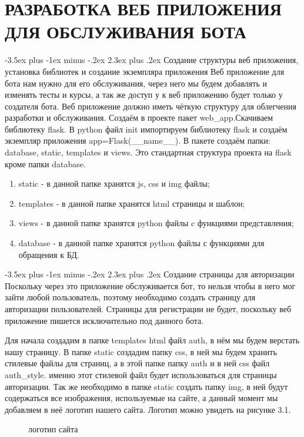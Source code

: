 \documentclass[12pt, oldlfont, amsfonts]{report}
\makeatletter
\renewcommand{\section}{\@startsection{section}{1}{0pt}%
                                {-3.5ex plus -1ex minus -.2ex}%
                                {2.3ex plus .2ex}%
{\centering\hyphenpenalty=10000\normalfont\Large\bfseries}}
\makeatother
\begin{document}
\chapter{\large{{РАЗРАБОТКА ВЕБ ПРИЛОЖЕНИЯ ДЛЯ ОБСЛУЖИВАНИЯ БОТА}}}
\section{Создание структуры веб приложения, установка библиотек и создание экземпляра приложения}
Веб приложение для бота нам нужно для его обслуживания, через него мы будем добавлять и изменять тесты и курсы, а так же доступ у к веб приложению будет только у создателя бота. Веб приложение должно иметь чёткую структуру для облегчения разработки и обслуживания. Создаём в проекте пакет { web\_app}.Скачиваем библиотеку flask. В python файл { init} импортируем библиотеку flask и создаём экземпляр приложения { app=Flask(\_\_name\_\_)}. В пакете создаём папки: { database}, { static}, { templates} и views. Это стандартная структура проекта на flask кроме папки database.
\begin{enumerate}
\item { static} - в данной папке хранятся { js}, { css} и { img} файлы;
\item { templates} - в данной папке хранятся { html} страницы и шаблон;
\item { views} - в данной папке хранятся python файлы c функциями представления;
\item { database} - в данной папке хранятся python файлы с функциями для обращения к БД.
\end{enumerate}	



\section{Создание страницы для авторизации}
Поскольку через это приложение обслуживается бот, то нельзя чтобы в него мог зайти любой пользователь, поэтому необходимо создать страницу для авторизации пользователей. Страницы для регистрации не будет, поскольку веб приложение пишется исключительно под данного бота.

Для начала создадим в папке { templates} html файл {auth}, в нём мы будем верстать нашу страницу. В папке { static} создадим папку {css}, в ней мы будем хранить стилевые файлы для страниц, а в этой папке папку {auth} и в ней css файл { auth\_style}. именно этот стилевой файл будет использоваться для страницы авторизации. Так же необходимо в папке {static} создать папку { img}, в ней будут содержаться все изображения, используемые на сайте, а данный момент мы добавляем в неё логотип нашего сайта. Логотип можно увидеть на рисунке 3.1.
\begin{figure}[h!]
\caption{логотип сайта}
\end{figure}
\end{document}
